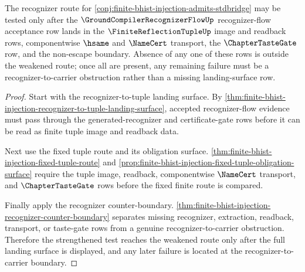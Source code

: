 \begin{theorem}
\label{thm:finite-bhist-injection-recognizer-landing-refinement}
The recognizer route for \autoref{conj:finite-bhist-injection-admits-stdbridge} may be tested only after the $\GroundCompilerRecognizerFlowUp$ recognizer-flow acceptance row lands in the $\FiniteReflectionTupleUp$ image and readback rows, componentwise $\hsame$ and $\NameCert$ transport, the $\ChapterTasteGate$ row, and the non-escape boundary. Absence of any one of these rows is outside the weakened route; once all are present, any remaining failure must be a recognizer-to-carrier obstruction rather than a missing landing-surface row.
\end{theorem}
\begin{proof}
Start with the recognizer-to-tuple landing surface. By \autoref{thm:finite-bhist-injection-recognizer-to-tuple-landing-surface}, accepted recognizer-flow evidence must pass through the generated-recognizer and certificate-gate rows before it can be read as finite tuple image and readback data.

Next use the fixed tuple route and its obligation surface. \autoref{thm:finite-bhist-injection-fixed-tuple-route} and \autoref{prop:finite-bhist-injection-fixed-tuple-obligation-surface} require the tuple image, readback, componentwise $\NameCert$ transport, and $\ChapterTasteGate$ rows before the fixed finite route is compared.

Finally apply the recognizer counter-boundary. \autoref{thm:finite-bhist-injection-recognizer-counter-boundary} separates missing recognizer, extraction, readback, transport, or taste-gate rows from a genuine recognizer-to-carrier obstruction. Therefore the strengthened test reaches the weakened route only after the full landing surface is displayed, and any later failure is located at the recognizer-to-carrier boundary.
\end{proof}

